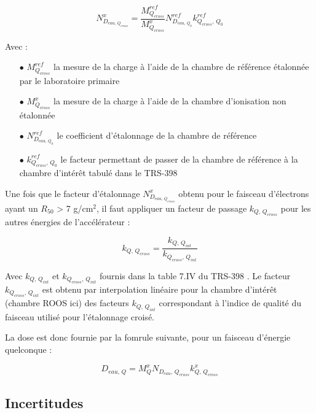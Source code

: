 \documentclass{article}
\begin{document}
\begin{equation}
  N_{D_{eau, \, Q_{cross}}}^x = \dfrac{M_{Q_{cross}}^{ref}}{M_{Q_{cross}}^x} N_{D_{eau,\, Q_0}}^{ref} k_{Q_{cross},\, Q_0}^{ref}
  \label{eq_cross_calib}
\end{equation}

Avec :

\begin{itemize}
  \item[$\bullet$] $M_{Q_{cross}}^{ref}$ la mesure de la charge à l'aide de la chambre de référence étalonnée par le laboratoire primaire
  \item[$\bullet$] $M_{Q_{cross}}^x$ la mesure de la charge à l'aide de la chambre d'ionisation non étalonnée
  \item[$\bullet$] $N_{D_{eau,\, Q_0}}^{ref}$ le coefficient d'étalonnage de la chambre de référence
  \item[$\bullet$] $k_{Q_{cross},\, Q_0}^{ref}$ le facteur permettant de passer de la chambre de référence à la chambre d'intérêt tabulé dans le TRS-398
\end{itemize}

Une fois que le facteur d'étalonnage $N_{D_{eau, \, Q_{cross}}}^x$ obtenu pour le faisceau d'électrons ayant un $R_{50}$ > 7 g/cm$^2$, il faut appliquer un facteur de passage $k_{Q,\, Q_{cross}}$ pour les autres énergies de l'accélérateur :

\begin{equation}
  k_{Q,\, Q_{cross}} = \dfrac{k_{Q,\, Q_{int}}}{k_{Q_{cross},\, Q_{int}}}
\end{equation}

Avec $k_{Q,\, Q_{int}}$ et $k_{Q_{cross},\, Q_{int}}$ fournis dans la table 7.IV du TRS-398 \cite{international2001iaea}. Le facteur $k_{Q_{cross},\, Q_{int}}$ est obtenu par interpolation linéaire pour la chambre d'intérêt (chambre ROOS ici) des facteurs $k_{Q,\, Q_{int}}$ correspondant à l'indice de qualité du faisceau utilisé pour l'étalonnage croisé.

La dose est donc fournie par la fomrule suivante, pour un faisceau d'énergie quelconque :

\begin{equation}
  D_{eau,\, Q} = M_Q^x N_{D_{eau},\, Q_{cross}} k_{Q,\, Q_{cross}}^x
\end{equation}

\subsection{Incertitudes}
\end{document}
